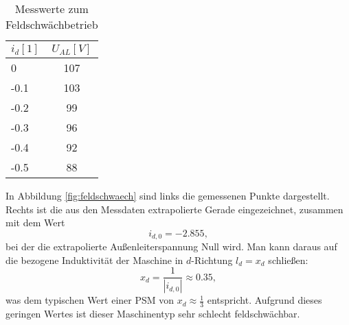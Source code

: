 \begin{table}[!ht]
\centering%
    \begin{tabular}{|l|c|}
    \hline
    $i_d [1]$ & $U_{AL} [V]$ \\ \hline
    0         & 107          \\ \hline
    -0.1      & 103          \\ \hline
    -0.2      & 99           \\ \hline
    -0.3      & 96           \\ \hline
    -0.4      & 92           \\ \hline
    -0.5      & 88           \\ \hline
    \end{tabular}
    \caption{Messwerte zum Feldschwächbetrieb}
    \label{tab:PSM_feldschwaech}
\end{table}
\noindent In Abbildung \ref{fig:feldschwaech} sind links die gemessenen Punkte dargestellt. Rechts ist die aus den Messdaten extrapolierte Gerade eingezeichnet, zusammen mit dem Wert
\begin{equation*}
    i_{d,0} = -2.855,
\end{equation*}
bei der die extrapolierte Außenleiterspannung Null wird. Man kann daraus auf die bezogene Induktivität der Maschine in $d$-Richtung $l_d=x_d$ schließen:
\begin{equation*}
    x_d = \frac{1}{|i_{d,0}|} \approx 0.35,
\end{equation*}
was dem typischen Wert einer PSM von $x_d \approx \frac{1}{3}$ entspricht. Aufgrund dieses geringen Wertes ist dieser Maschinentyp sehr schlecht feldschwächbar.
